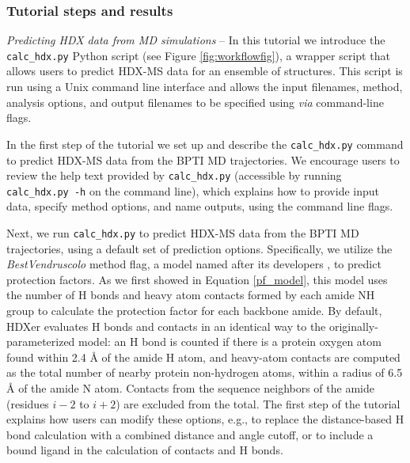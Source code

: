\documentclass[9pt,tutorial]{livecoms}
\begin{document}
\subsubsection{Tutorial steps and results}\label{calc_hdx_py_sect}

\noindent
\textit{Predicting HDX data from MD simulations} -- In this tutorial we introduce the \texttt{calc\_hdx.py} Python script (see Figure \ref{fig:workflowfig}), a wrapper script that allows users to predict HDX-MS data for an ensemble of structures. 
This script is run using a Unix command line interface and allows the input filenames, method, analysis options, and output filenames to be specified using \textit{via} command-line flags.

In the first step of the tutorial we set up and describe the \texttt{calc\_hdx.py} command to predict HDX-MS data from the BPTI MD trajectories.
We encourage users to review the help text provided by \texttt{calc\_hdx.py} (accessible by running \texttt{calc\_hdx.py -h} on the command line), which explains how to provide input data, specify method options, and name outputs, using the command line flags.

Next, we run \texttt{calc\_hdx.py} to predict HDX-MS data from the BPTI MD trajectories, using a default set of prediction options.
Specifically, we utilize the \textit{BestVendruscolo} method flag, a model named after its developers \cite{BestVendruscolo2006}, to predict protection factors.
As we first showed in Equation \ref{pf_model}, this model uses the number of H bonds and heavy atom contacts formed by each amide NH group to calculate the protection factor for each backbone amide.
By default, HDXer evaluates H bonds and contacts in an identical way to the originally-parameterized model: an H bond is counted if there is a protein oxygen atom found within 2.4 Å of the amide H atom, and heavy-atom contacts are computed as the total number of nearby protein non-hydrogen atoms, within a radius of 6.5 Å of the amide N atom.
Contacts from the sequence neighbors of the amide (residues $i-2$ to $i+2$) are excluded from the total.
The first step of the tutorial explains how users can modify these options, e.g., to replace the distance-based H bond calculation with a combined distance and angle cutoff, or to include a bound ligand in the calculation of contacts and H bonds. 
\end{document}
